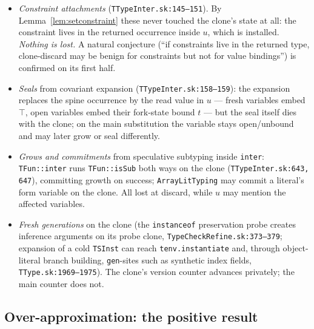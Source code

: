 \documentclass[11pt]{article}
\begin{document}
\begin{itemize}
\item[\textbf{(C1)}] \emph{Constraint attachments}
  (\texttt{TTypeInter.sk:145--151}). By
  Lemma~\ref{lem:setconstraint} these never touched the clone's state at
  all: the constraint lives in the returned occurrence inside $u$, which
  is installed. \emph{Nothing is lost.} A natural conjecture
  (``if constraints live in the returned type, clone-discard may be
  benign for constraints but not for value bindings'') is confirmed on
  its first half.
\item[\textbf{(C2)}] \emph{Seals} from covariant expansion
  (\texttt{TTypeInter.sk:158--159}): the expansion replaces the spine
  occurrence by the read value in $u$ — fresh variables embed $\top$,
  open variables embed their fork-state bound $t$ — but the seal itself
  dies with the clone; on the main substitution the variable stays
  open/unbound and may later grow or seal differently.
\item[\textbf{(C3)}] \emph{Grows and commitments} from speculative
  subtyping inside \texttt{inter}: \texttt{TFun::inter} runs
  \texttt{TFun::isSub} both ways on the clone
  (\texttt{TTypeInter.sk:643, 647}), committing growth on success;
  \texttt{ArrayLitTyping} may commit a literal's form variable on the
  clone. All lost at discard, while $u$ may mention the affected
  variables.
\item[\textbf{(C4)}] \emph{Fresh generations} on the clone (the
  \texttt{instanceof} preservation probe creates inference arguments on
  its probe clone, \texttt{TypeCheckRefine.sk:373--379}; expansion of
  a cold \texttt{TSInst} can reach \texttt{tenv.instantiate} and, through
  object-literal branch building, \texttt{gen}-sites such as synthetic
  index fields, \texttt{TType.sk:1969--1975}). The clone's version
  counter advances privately; the main counter does not.
\end{itemize}

\subsection{Over-approximation: the positive result}
\end{document}
